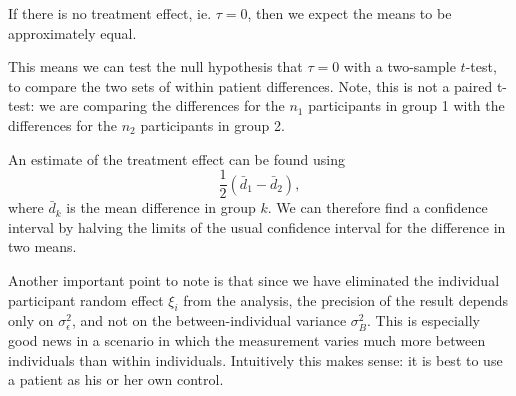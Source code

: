 \documentclass[
  openany]{book}
\theoremstyle{definition}
\theoremstyle{definition}
\theoremstyle{definition}
\theoremstyle{definition}
\theoremstyle{remark}
\begin{document}
If there is no treatment effect, ie. \(\tau=0\), then we expect the means to be approximately equal.

This means we can test the null hypothesis that \(\tau=0\) with a two-sample \(t\)-test, to compare the two sets of within patient differences. Note, this is not a paired t-test: we are comparing the differences for the \(n_1\) participants in group 1 with the differences for the \(n_2\) participants in group 2.

An estimate of the treatment effect can be found using
\[\frac{1}{2}\left(\bar{d}_1 - \bar{d}_2\right),\]
where \(\bar{d}_k\) is the mean difference in group \(k\). We can therefore find a confidence interval by halving the limits of the usual confidence interval for the difference in two means.

Another important point to note is that since we have eliminated the individual participant random effect \(\xi_i\) from the analysis, the precision of the result depends only on \(\sigma^2_{\epsilon}\), and not on the between-individual variance \(\sigma^2_B\). This is especially good news in a scenario in which the measurement varies much more between individuals than within individuals. Intuitively this makes sense: it is best to use a patient as his or her own control.
\end{document}

